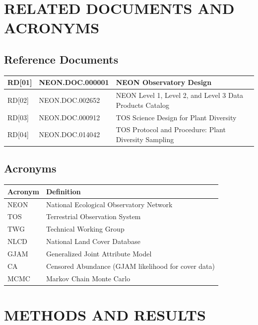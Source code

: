 \documentclass[
  11pt,
]{article}
\begin{document}
\section{\uppercase{Related Documents and Acronyms}}

\subsection{Reference Documents}\label{reference-documents}

\begin{tabular}{|m{1cm}|m{3cm}|m{11cm}|}
\hline
RD[01]&NEON.DOC.000001&NEON Observatory Design\\ \hline RD[02]&NEON.DOC.002652&NEON Level 1, Level 2, and Level 3 Data Products Catalog\\ \hline RD[03]&NEON.DOC.000912&TOS Science Design for Plant Diversity\\ \hline RD[04]&NEON.DOC.014042&TOS Protocol and Procedure: Plant Diversity Sampling\\ \hline
\end{tabular}

\subsection{Acronyms}\label{acronyms}

\begin{tabular}{|m{3cm}|m{12.5cm}|}
\hline
\bfseries{Acronym}&  \bfseries{Definition}  \\ \hline
  NEON  &  National Ecological Observatory Network \\ \hline
  TOS   &  Terrestrial Observation System \\ \hline
 TWG   &  Technical Working Group \\ \hline
 NLCD  & National Land Cover Database \\ \hline
 GJAM  & Generalized Joint Attribute Model \\ \hline
 CA    & Censored Abundance (GJAM likelihood for cover data) \\ \hline
 MCMC  & Markov Chain Monte Carlo \\ \hline
\end{tabular}

\section{\uppercase{Methods and Results}}
\end{document}
